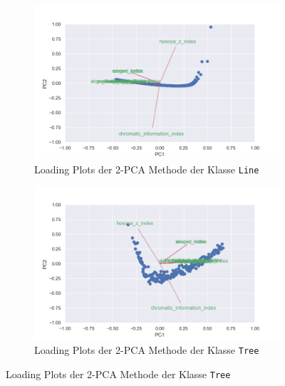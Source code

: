 \begin{figure}[H]
    \ContinuedFloat
    \centering
    \begin{subfigure}{.5\textwidth}
        \includegraphics[width=\textwidth]{images/30_results/line-pca-loadings.png}
        \caption{Loading Plots der 2-PCA Methode der Klasse \texttt{Line}}
        \label{fig:pca-loading-line}
    \end{subfigure}%
    \begin{subfigure}{.5\textwidth}
        \includegraphics[width=\textwidth]{images/30_results/tree-pca-loadings.png}
        \caption{Loading Plots der 2-PCA Methode der Klasse \texttt{Tree}}
        \label{fig:pca-loading-tree}
    \end{subfigure}
\end{figure}

